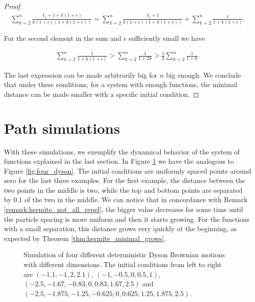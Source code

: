 \begin{proof}
    \begin{align*}
        \sum_{k=2}^{n} \frac{\lambda_j + 1 + k(1+\epsilon)}{k(1+\epsilon)(1+k(1+\epsilon))} = \sum_{k=2}^n \frac{\lambda_j + 1}{k(1+\epsilon)(1+k(1+\epsilon))} + \sum_{k=2}^n \frac{1}{1+k(1+\epsilon)}.
    \end{align*}

    For the second element in the sum and $\epsilon$ sufficiently small we have 

    \begin{align*}
        \sum_{k=2}^n \frac{1}{1+k(1+\epsilon)} > \sum_{k=2}^n \frac{1}{1+2k} > \frac12\sum_{k=2}^n \frac{1}{1+k}.
    \end{align*}

    The last expression can be made arbitrarily big for $n$ big enough. We conclude that under these conditions, for a system with enough functions, the minimal distance can be made smaller with a specific initial condition.
    
\end{proof}


\section{Path simulations}

With these simulations, we exemplify the dynamical behavior of the system of functions explained in the last section. In Figure \ref{fig:four_det_dyson} we have the analogous to Figure \ref{fig:four_dyson}. The initial conditions are uniformly spaced points around zero for the last three examples. For the first example, the distance between the two points in the middle is two, while the top and bottom points are separated by 0.1 of the two in the middle. We can notice that in concordance with Remark \ref{remark:hermite_not_all_repel}, the bigger value decreases for some time until the particle spacing is more uniform and then it starts growing. For the functions with a small separation, this distance grows very quickly at the beginning, as expected by Theorem \ref{thm:hermite_minimal_grows}.


\begin{figure}[h!] \centering 
    
    \caption{Simulation of four different deterministic Dyson Brownian motions with different dimensions. The initial conditions from left to right are $(-1.1,-1,2,2.1)$, $(-1, -0.5, 0, 0.5, 1)$, $(-2.5,-1.67,-0.83,0,0.83,1.67,2.5)$ and $(-2.5,-1.875,-1.25,-0.625,0,0.625,1.25,1.875,2.5)$. \label{fig:four_det_dyson}}
\end{figure}

